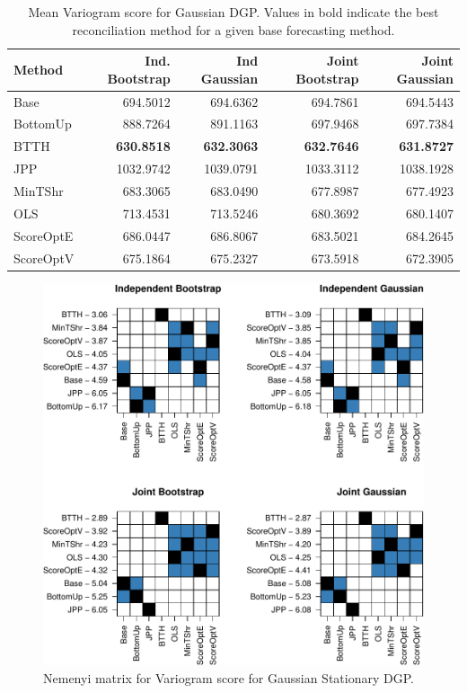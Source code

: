 \documentclass[11pt]{article}
\theoremstyle{definition}
\begin{document}
\begin{table}[H]
	\footnotesize
	\caption{\label{tab:gsv}Mean Variogram score for Gaussian DGP\@. Values in bold indicate the best reconciliation method for a given base forecasting method.}
	\centering
	\begin{tabular}[t]{lrrrr}
		\toprule
    Method    & Ind. Bootstrap    & Ind Gaussian      & Joint Bootstrap   & Joint Gaussian\\
		\midrule
    Base      & 694.5012          & 694.6362          & 694.7861          & 694.5443\\
    BottomUp  & 888.7264          & 891.1163          & 697.9468          & 697.7384\\
    BTTH      & \textbf{630.8518} & \textbf{632.3063} & \textbf{632.7646} & \textbf{631.8727}\\
    JPP       & 1032.9742         & 1039.0791         & 1033.3112         & 1038.1928\\
    MinTShr   & 683.3065          & 683.0490          & 677.8987          & 677.4923\\
    OLS       & 713.4531          & 713.5246          & 680.3692          & 680.1407\\
    ScoreOptE & 686.0447          & 686.8067          & 683.5021          & 684.2645\\
    ScoreOptV & 675.1864          & 675.2327          & 673.5918          & 672.3905\\
		\bottomrule
	\end{tabular}
\end{table}

\begin{figure}[H]
	\centering
	\includegraphics[width=.75\textwidth]{Figs/gsv.pdf}
	\caption{Nemenyi matrix for Variogram score for Gaussian Stationary DGP.}
	\label{fig:gsv}

\end{figure}
\end{document}
